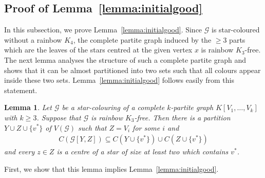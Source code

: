 \documentclass[a4paper, 12pt]{article}
\numberwithin{equation}{section}
\newtheorem{lemma}[theorem]{Lemma}
\newcommand{\ms}[1]{\mathscr{#1}}
\begin{document}


\subsection{Proof of Lemma~\ref{lemma:initialgood}}

In this subsection, we prove Lemma~\ref{lemma:initialgood}.
Since $\ms{G}$ is star-coloured without a rainbow $K_4$, the complete partite graph induced by the $\geq 3$ parts which are the leaves of the stars centred at the given vertex $x$ is rainbow $K_3$-free.
The next lemma analyses the structure of such a complete partite graph and shows that it can be almost partitioned into two sets such that all colours appear inside these two sets.
Lemma~\ref{lemma:initialgood} follows easily from this statement.
 

\begin{lemma} \label{lem:G[V_1V_2]}
Let $\ms{G}$ be a star-colouring of a complete $k$-partite graph $K[V_1,\ldots,V_k]$ with $k \geq 3$. 
Suppose that $\ms{G}$ is rainbow $K_3$-free.
Then there is a partition $Y\cup Z\cup \{v^*\}$ of $V(\ms G)$ such that $Z=V_i$ for some $i$ and
\begin{align*}
	C(\ms{G}[Y, Z]) \subseteq  C( Y \cup \{v^*\} ) \cup C ( Z \cup \{v^*\} ) 
\end{align*}
and every $z \in Z$ is a centre of a star of size at least two which contains $v^*$.
\end{lemma}


First, we show that this lemma implies Lemma~\ref{lemma:initialgood}.
\end{document}
